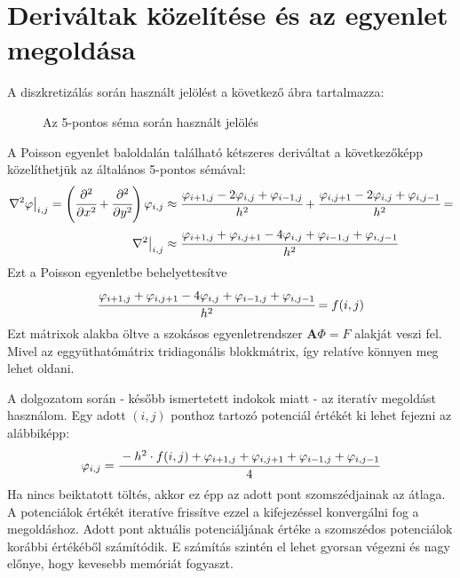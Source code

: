\section{Deriváltak közelítése és az egyenlet megoldása}
A diszkretizálás során használt jelölést a következő ábra tartalmazza:
\begin{figure}[H]
\centering
\caption{Az 5-pontos séma során használt jelölés} 
\end{figure}
A Poisson egyenlet baloldalán található kétszeres deriváltat a következőképp közelíthetjük az általános 5-pontos sémával:
\begin{align}
\left.\nabla^2 \varphi\right|_{i,j} = \left(\cfrac{\partial^2}{\partial x^2}+\cfrac{\partial^2}{\partial y^2}\right) \varphi_{i,j} &\approx
\cfrac{\varphi_{i+1,j}-2\varphi_{i,j}+\varphi_{i-1,j}}{h^2} +
\cfrac{\varphi_{i,j+1}-2\varphi_{i,j}+\varphi_{i,j-1}}{h^2} =\\
\left.\nabla^2\right|_{i,j} &\approx
\cfrac{\varphi_{i+1,j}+\varphi_{i,j+1}-4\varphi_{i,j}+\varphi_{i-1,j}+\varphi_{i,j-1}}{h^2}
\end{align}
Ezt a Poisson egyenletbe behelyettesítve
\begin{align}
\cfrac{\varphi_{i+1,j}+\varphi_{i,j+1}-4\varphi_{i,j}+\varphi_{i-1,j}+\varphi_{i,j-1}}{h^2} = f(i,j)
\end{align}
Ezt mátrixok alakba öltve a szokásos egyenletrendszer $\mathbf{A}\Phi = F$ alakját veszi fel.
Mivel az eggyüthatómátrix tridiagonális blokkmátrix, így relatíve könnyen meg lehet oldani.

A dolgozatom során - később ismertetett indokok miatt - az iteratív megoldást használom.
Egy adott $(i,j)$ ponthoz tartozó potenciál értékét ki lehet fejezni az alábbiképp:
\begin{equation}
\varphi_{i,j} = \cfrac{-h^2\cdot f(i,j) +\varphi_{i+1,j}+\varphi_{i,j+1}+\varphi_{i-1,j}+\varphi_{i,j-1}}{4}
\end{equation}
Ha nincs beiktatott töltés, akkor ez épp az adott pont szomszédjainak az átlaga. 
A potenciálok értékét iteratíve frissítve ezzel a kifejezéssel
konvergálni fog a megoldáshoz.
Adott pont aktuális potenciáljának értéke a szomszédos potenciálok
korábbi értékéből számítódik.
E számítás szintén el lehet gyorsan végezni és nagy előnye, hogy kevesebb memóriát fogyaszt.

